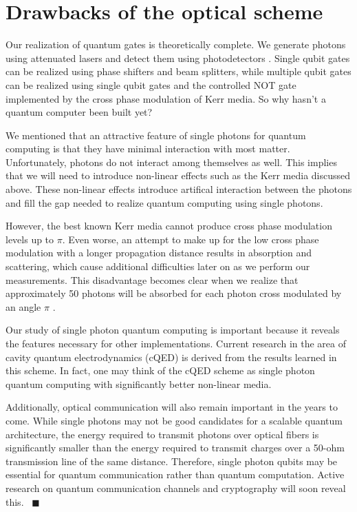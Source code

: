 \section{Drawbacks of the optical scheme}
Our realization of quantum gates is theoretically complete. We generate photons using attenuated lasers and detect them using photodetectors \cite{klm,nielsen2000}. Single qubit gates can be realized using phase shifters and beam splitters, while multiple qubit gates can be realized using single qubit gates and the controlled NOT gate implemented by the cross phase modulation of Kerr media. So why hasn't a quantum computer been built yet?

We mentioned that an attractive feature of single photons for quantum computing is that they have minimal interaction with most matter. Unfortunately, photons do not interact among themselves as well. This implies that we will need to introduce non-linear effects such as the Kerr media discussed above. These non-linear effects introduce artifical interaction between the photons and fill the gap needed to realize quantum computing using single photons. 

However, the best known Kerr media cannot produce cross phase modulation levels up to $\pi$. Even worse, an attempt to make up for the low cross phase modulation with a longer propagation distance results in absorption and scattering, which cause additional difficulties later on as we perform our measurements. This disadvantage becomes clear when we realize that approximately 50 photons will be absorbed for each photon cross modulated by an angle $\pi$ \cite{nielsen2000}. 

Our study of single photon quantum computing is important because it reveals the features necessary for other implementations. Current research in the area of cavity quantum electrodynamics (cQED) is derived from the results learned in this scheme. In fact, one may think of the cQED scheme as single photon quantum computing with significantly better non-linear media.

Additionally, optical communication will also remain important in the years to come. While single photons may not be good candidates for a scalable quantum architecture, the energy required to transmit photons over optical fibers is significantly smaller than the energy required to transmit charges over a 50-ohm transmission line of the same distance. Therefore, single photon qubits may be essential for quantum communication rather than quantum computation. Active research on quantum communication channels and cryptography will soon reveal this.
~\hfill$\blacksquare$
